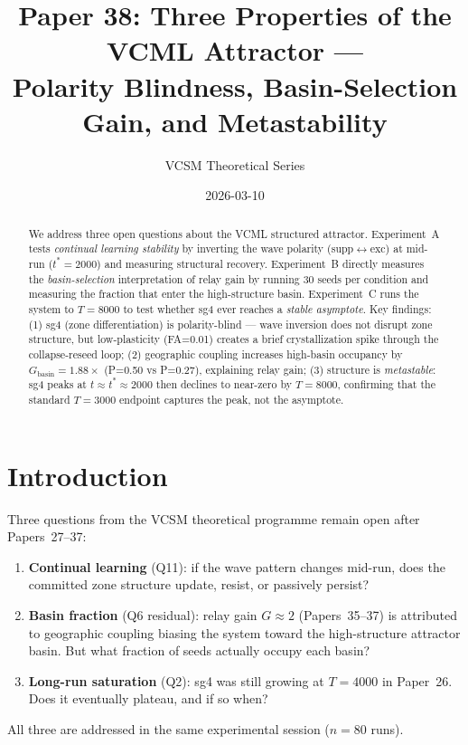 \documentclass[11pt]{article}
\title{\textbf{Paper 38: Three Properties of the VCML Attractor ---\\
Polarity Blindness, Basin-Selection Gain, and Metastability}}
\author{VCSM Theoretical Series}
\date{2026-03-10}
\begin{document}
\maketitle

\begin{abstract}
We address three open questions about the VCML structured attractor.
Experiment~A tests \emph{continual learning stability} by inverting the
wave polarity (supp$\leftrightarrow$exc) at mid-run ($t^*=2000$) and
measuring structural recovery.
Experiment~B directly measures the \emph{basin-selection} interpretation
of relay gain by running 30 seeds per condition and measuring the fraction
that enter the high-structure basin.
Experiment~C runs the system to $T=8000$ to test whether sg4 ever reaches
a \emph{stable asymptote}.
Key findings: (1) sg4 (zone differentiation) is polarity-blind --- wave
inversion does not disrupt zone structure, but low-plasticity (FA=0.01)
creates a brief crystallization spike through the collapse-reseed loop;
(2) geographic coupling increases high-basin occupancy by
$G_\mathrm{basin}=1.88\times$ (P=0.50 vs P=0.27), explaining relay gain;
(3) structure is \emph{metastable}: sg4 peaks at $t\approx t^*\approx 2000$
then declines to near-zero by $T=8000$, confirming that the standard
$T=3000$ endpoint captures the peak, not the asymptote.
\end{abstract}

\section{Introduction}

Three questions from the VCSM theoretical programme remain open after Papers~27--37:
\begin{enumerate}
  \item \textbf{Continual learning} (Q11): if the wave pattern changes mid-run,
        does the committed zone structure update, resist, or passively persist?
  \item \textbf{Basin fraction} (Q6 residual): relay gain $G\approx 2$
        (Papers~35--37) is attributed to geographic coupling biasing the
        system toward the high-structure attractor basin.
        But what fraction of seeds actually occupy each basin?
  \item \textbf{Long-run saturation} (Q2): sg4 was still growing at $T=4000$
        in Paper~26.  Does it eventually plateau, and if so when?
\end{enumerate}
All three are addressed in the same experimental session ($n=80$ runs).
\end{document}
